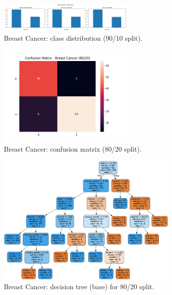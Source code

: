 \begin{figure}[H]
	\centering
	\includegraphics[width=0.6\textwidth]{imgs/class_dist/class_dist__breast_cancer__90_vs_10.png}
	\caption{Breast Cancer: class distribution (90/10 split).}
	\label{fig:bc-cd-90-10}
\end{figure}

\begin{figure}[H]
	\centering
	\includegraphics[width=0.6\textwidth]{imgs/confusion_mat/confusion_mat__breast_cancer__80_vs_20.png}
	\caption{Breast Cancer: confusion matrix (80/20 split).}
	\label{fig:bc-cm-80-20}
\end{figure}

\begin{figure}[H]
	\centering
	\includegraphics[width=0.8\textwidth]{imgs/dt/dt__breast_cancer__80_vs_20.png}
	\caption{Breast Cancer: decision tree (base) for 80/20 split.}
	\label{fig:bc-dt-base}
\end{figure}

